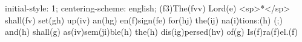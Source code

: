 initial-style: 1;
centering-scheme: english;
(f3)The(fvv) Lord(e) <sp>*</sp> shall(fv) set(gh) up(iv) an(hg) en(f)sign(fe) for(hj) the(ij) na(i)tions:(h) (;) and(h) shall(g) as(iv)sem(ji)ble(h) the(h) dis(ig)persed(hv) of(g) Is(f)ra(f)el.(f)
